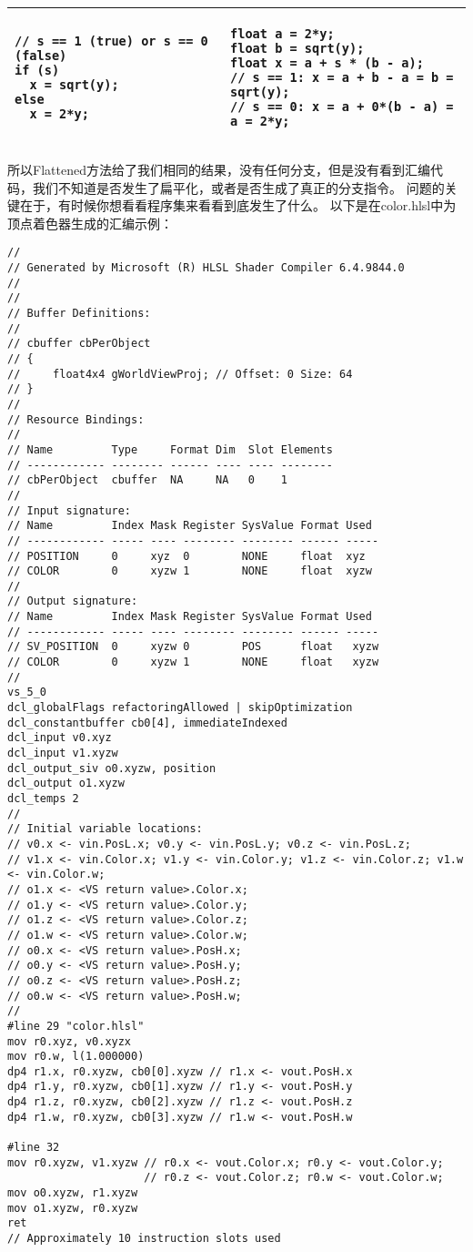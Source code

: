 \begin{flushleft}
\begin{tabular}{|p{20em}|p{20em}|}
\begin{lstlisting}
// s == 1 (true) or s == 0 (false)
if (s)
  x = sqrt(y);
else
  x = 2*y;
\end{lstlisting}
&
\begin{lstlisting}
float a = 2*y;
float b = sqrt(y);
float x = a + s * (b - a);
// s == 1: x = a + b - a = b = sqrt(y);
// s == 0: x = a + 0*(b - a) = a = 2*y;
\end{lstlisting}\\
\hline
\end{tabular}
所以Flattened方法给了我们相同的结果，没有任何分支，但是没有看到汇编代码，我们不知道是否发生了扁平化，或者是否生成了真正的分支指令。 问题的关键在于，有时候你想看看程序集来看看到底发生了什么。 以下是在color.hlsl中为顶点着色器生成的汇编示例：\\
\begin{lstlisting}
//
// Generated by Microsoft (R) HLSL Shader Compiler 6.4.9844.0
//
//
// Buffer Definitions:
//
// cbuffer cbPerObject
// {
//     float4x4 gWorldViewProj; // Offset: 0 Size: 64
// }
//
// Resource Bindings:
//
// Name         Type     Format Dim  Slot Elements
// ------------ -------- ------ ---- ---- --------
// cbPerObject  cbuffer  NA     NA   0    1
//
// Input signature:
// Name         Index Mask Register SysValue Format Used
// ------------ ----- ---- -------- -------- ------ -----
// POSITION     0     xyz  0        NONE     float  xyz
// COLOR        0     xyzw 1        NONE     float  xyzw
//
// Output signature:
// Name         Index Mask Register SysValue Format Used
// ------------ ----- ---- -------- -------- ------ -----
// SV_POSITION  0     xyzw 0        POS      float   xyzw
// COLOR        0     xyzw 1        NONE     float   xyzw
//
vs_5_0
dcl_globalFlags refactoringAllowed | skipOptimization
dcl_constantbuffer cb0[4], immediateIndexed
dcl_input v0.xyz
dcl_input v1.xyzw
dcl_output_siv o0.xyzw, position
dcl_output o1.xyzw
dcl_temps 2
//
// Initial variable locations:
// v0.x <- vin.PosL.x; v0.y <- vin.PosL.y; v0.z <- vin.PosL.z;
// v1.x <- vin.Color.x; v1.y <- vin.Color.y; v1.z <- vin.Color.z; v1.w <- vin.Color.w;
// o1.x <- <VS return value>.Color.x;
// o1.y <- <VS return value>.Color.y;
// o1.z <- <VS return value>.Color.z;
// o1.w <- <VS return value>.Color.w;
// o0.x <- <VS return value>.PosH.x;
// o0.y <- <VS return value>.PosH.y;
// o0.z <- <VS return value>.PosH.z;
// o0.w <- <VS return value>.PosH.w;
//
#line 29 "color.hlsl"
mov r0.xyz, v0.xyzx
mov r0.w, l(1.000000)
dp4 r1.x, r0.xyzw, cb0[0].xyzw // r1.x <- vout.PosH.x
dp4 r1.y, r0.xyzw, cb0[1].xyzw // r1.y <- vout.PosH.y
dp4 r1.z, r0.xyzw, cb0[2].xyzw // r1.z <- vout.PosH.z
dp4 r1.w, r0.xyzw, cb0[3].xyzw // r1.w <- vout.PosH.w

#line 32
mov r0.xyzw, v1.xyzw // r0.x <- vout.Color.x; r0.y <- vout.Color.y;
                     // r0.z <- vout.Color.z; r0.w <- vout.Color.w;
mov o0.xyzw, r1.xyzw
mov o1.xyzw, r0.xyzw
ret
// Approximately 10 instruction slots used
\end{lstlisting}
\end{flushleft}

